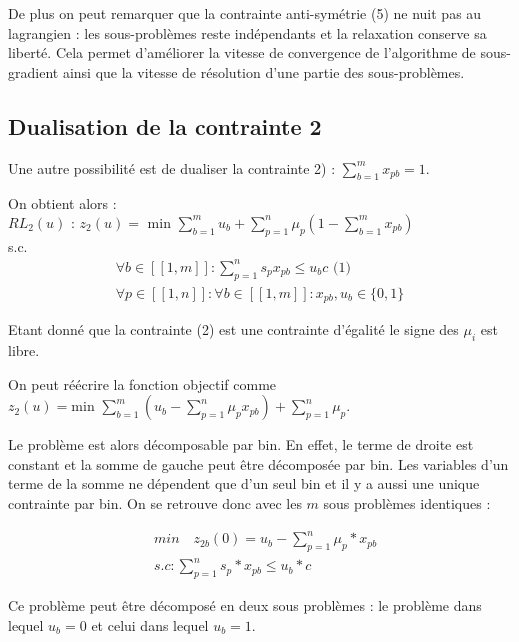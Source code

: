 \documentclass{article}
\begin{document}
De plus on peut remarquer que la contrainte anti-symétrie (5) ne nuit pas au lagrangien : les sous-problèmes reste indépendants et la relaxation conserve sa liberté. Cela permet d'améliorer la vitesse de convergence de l'algorithme de sous-gradient ainsi que la vitesse de résolution d'une partie des sous-problèmes. 

\subsection{Dualisation de la contrainte 2}

Une autre possibilité est de dualiser la contrainte 2) : $\sum_{b=1}^m x_{pb} = 1$. \newline

On obtient alors :\\
$RL_2(u) \text{ : } z_2(u) = \text{ min } \sum \limits_{b = 1}^{m} u_b + \sum \limits_{p = 1}^{n} \mu_p (1 - \sum \limits_{b = 1}^{m} x_{pb})$\\
s.c.
\begin{align*}
 \forall b \in [\![ 1 , m ]\!] : \sum \limits_{p = 1}^{n} s_p x_{pb} \leqslant u_b c \text{ (1)}\\
 \forall p \in [\![ 1 , n ]\!] : \forall b \in [\![ 1 , m ]\!] : x_{pb}, u_b \in \{0,1\}
\end{align*}

Etant donné que la contrainte (2) est une contrainte d'égalité le signe des $\mu_i$ est libre.\newline

On peut réécrire la fonction objectif comme $z_2(u) = \text{min } \sum \limits_{b = 1}^{m} \left( u_b - \sum \limits_{p = 1}^{n} \mu_p x_{pb} \right) + \sum \limits_{p = 1}^{n} \mu_p$.\newline

Le problème est alors décomposable par bin. En effet, le terme de droite est constant et la somme de gauche peut être décomposée par bin. Les variables d'un terme de la somme ne dépendent que d'un seul bin et il y a aussi une unique contrainte par bin. On se retrouve donc avec les $m$ sous problèmes identiques :

\begin{align*}
    &min \quad z_{2b}(0) = u_b - \sum \limits_{p=1}^n \mu_p*x_{pb}\\
    &s.c: \sum \limits_{p=1}^n s_p*x_{pb} \leq u_b*c
\end{align*}

Ce problème peut être décomposé en deux sous problèmes : le problème dans lequel $u_b = 0$ et celui dans lequel $u_b = 1$.\newline
\end{document}
